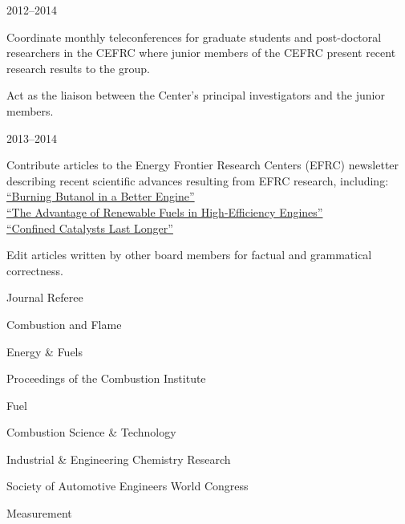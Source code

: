 \begin{lonelist}
\item[]  \hfill 2012--2014\\

\begin{innerlist}
\item Coordinate monthly teleconferences for graduate students
and post-doctoral researchers in the CEFRC where junior members of
the CEFRC present recent research results to the group.
\item Act as the liaison between the Center's principal investigators
and the junior members.
\end{innerlist}

\newpage

\item[]  \hfill 2013--2014\\

\begin{innerlist}
\item Contribute articles to the Energy Frontier Research Centers (EFRC)
newsletter describing recent scientific advances resulting from
EFRC research, including:\\
\hspace*{0.25in}\href{http://www.energyfrontier.us/newsletter/201210/burning-butanol-better-engine}
{``Burning Butanol in a Better Engine''}\\
\hspace*{0.25in}\href{http://www.energyfrontier.us/newsletter/201401/advantage-renewable-fuels-high-efficiency-engines}
{``The Advantage of Renewable Fuels in High-Efficiency Engines''}\\
\hspace*{0.25in}\href{http://www.energyfrontier.us/newsletter/201404/confined-catalysts-last-longer}
{``Confined Catalysts Last Longer''}
\item Edit articles written by other board members for factual and grammatical correctness.
\end{innerlist}

\item[] Journal Referee
   \begin{innerlist}
       \item Combustion and Flame
       \item Energy \& Fuels
       \item Proceedings of the Combustion Institute
       \item Fuel
       \item Combustion Science \& Technology
       \item Industrial \& Engineering Chemistry Research
       \item Society of Automotive Engineers World Congress
       \item Measurement
   \end{innerlist}

\end{lonelist}

